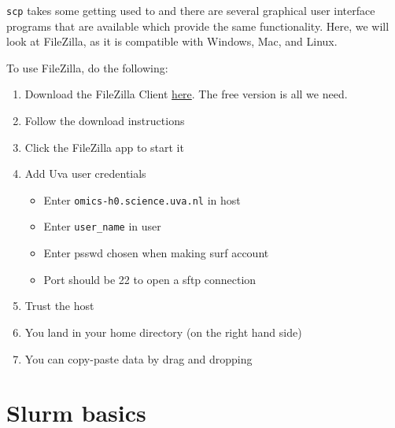 \documentclass[
  letterpaper,
  DIV=11,
  numbers=noendperiod]{scrreprt}
\providecommand{\tightlist}{%
  \setlength{\itemsep}{0pt}\setlength{\parskip}{0pt}}\usepackage{longtable,booktabs,array}
\begin{document}
\begin{tcolorbox}[enhanced jigsaw, colframe=quarto-callout-tip-color-frame, title=\textcolor{quarto-callout-tip-color}{\faLightbulb}\hspace{0.5em}{Tip: Moving files using the FileZilla GUI}, titlerule=0mm, toptitle=1mm, left=2mm, colbacktitle=quarto-callout-tip-color!10!white, bottomtitle=1mm, coltitle=black, breakable, colback=white, arc=.35mm, bottomrule=.15mm, rightrule=.15mm, leftrule=.75mm, opacityback=0, toprule=.15mm, opacitybacktitle=0.6]

\texttt{scp} takes some getting used to and there are several graphical
user interface programs that are available which provide the same
functionality. Here, we will look at FileZilla, as it is compatible with
Windows, Mac, and Linux.

To use FileZilla, do the following:

\begin{enumerate}
\def\labelenumi{\arabic{enumi}.}
\tightlist
\item
  Download the FileZilla Client
  \href{https://filezilla-project.org/}{here}. The free version is all
  we need.
\item
  Follow the download instructions
\item
  Click the FileZilla app to start it
\item
  Add Uva user credentials

  \begin{itemize}
  \tightlist
  \item
    Enter \texttt{omics-h0.science.uva.nl} in host
  \item
    Enter \texttt{user\_name} in user
  \item
    Enter psswd chosen when making surf account
  \item
    Port should be 22 to open a sftp connection
  \end{itemize}
\item
  Trust the host
\item
  You land in your home directory (on the right hand side)
\item
  You can copy-paste data by drag and dropping
\end{enumerate}

\end{tcolorbox}

\section{Slurm basics}\label{slurm-basics}
\end{document}
